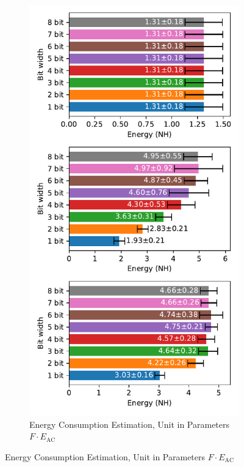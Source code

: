         \begin{figure}[H]
            \centering
            \begin{subfigure}[H]{0.7\textwidth}
                \centering
                \includegraphics[width=\textwidth]{../standard/MNIST/plots/mnist_test_energy_nh.pdf}
                \caption{Energy Consumption Estimation, Unit in Parameters $F\cdot E_{\text{AC}}$}
            \end{subfigure}
        \end{figure}
